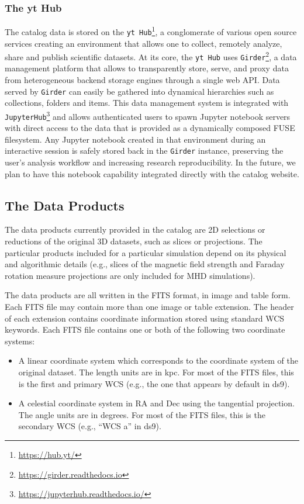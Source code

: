 \documentclass{emulateapj}
\newcommand{\code}[1]{\texttt{#1}}
\begin{document}
\subsubsection{The yt Hub}\label{sec:yt_hub}
The catalog data is stored on the \code{yt Hub}\footnote{\url{https://hub.yt/}}, a conglomerate of various open source
services creating an environment that allows one to collect, remotely analyze, share and publish scientific datasets. At
its core, the \code{yt Hub} uses \code{Girder}\footnote{\url{https://girder.readthedocs.io}}, a data management platform
that allows to transparently store, serve, and proxy data from heterogeneous backend storage engines through a single
web API. Data served by \code{Girder} can easily be gathered into dynamical hierarchies such as collections, folders and
items.  This data management system is integrated with
\code{JupyterHub}\footnote{\url{https://jupyterhub.readthedocs.io/}} and allows authenticated users to spawn Jupyter
notebook servers with direct access to the data that is provided as a dynamically composed FUSE filesystem. Any Jupyter
notebook created in that environment during an interactive session is safely stored back in the \code{Girder} instance,
preserving the user's analysis workflow and increasing research reproducibility. In the future, we plan to have this
notebook capability integrated directly with the catalog website.

\subsection{The Data Products}\label{sec:data}

The data products currently provided in the catalog are 2D selections or reductions of the original 3D datasets, such as slices or projections. The particular products included for a particular simulation depend on its physical and algorithmic details (e.g., slices of the magnetic field strength and Faraday rotation measure projections are only included for MHD simulations).

The data products are all written in the FITS format, in image and table form. Each FITS file may contain more than one image or table extension. The header of each extension contains coordinate information stored using standard WCS keywords. Each FITS file contains one or both of the following two coordinate systems:

\begin{itemize}
\item A linear coordinate system which corresponds to the coordinate system of the original dataset. The length units are in kpc. For most of the FITS files, this is the first and primary WCS (e.g., the one that appears by default in ds9).
\item A celestial coordinate system in RA and Dec using the tangential projection. The angle units are in degrees. For most of the FITS files, this is the secondary WCS (e.g., ``WCS a'' in ds9).
\end{itemize}
\end{document}
